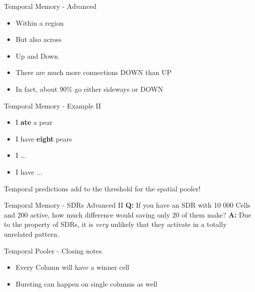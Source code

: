 \begin{frame}[c]{Temporal Memory - Advanced}
    \Large
    \begin{itemize}[<+(1)->]
        \item Within a region
        \item But also across
        \item Up and Down
        \item There are much more connections DOWN than UP
        \item In fact, about 90\% go either sideways or DOWN
    \end{itemize}
\end{frame}


\begin{frame}[c]{Temporal Memory - Example II}
    \Large
    \begin{itemize}[<+(1)->]
        \item I \textbf{ate} a pear
        \item I have \textbf{eight} pears
    \end{itemize}
    \vfill
    \begin{itemize}[<+(1)->]
        \item I ...
        \item I have ...
    \end{itemize}
    \pause
    Temporal predictions add to the threshold for the spatial pooler!
\end{frame}


\begin{frame}[c]{Temporal Memory - SDRs Advanced II}
    \Large
    \textbf{Q:} If you have an SDR with 10 000 Cells and 200 active, how much difference would saving only 20 of them make?
    \newline
    \pause
    \newline
    \textbf{A:} Due to the property of SDRs, it is {\em very} unlikely that they activate in a totally unrelated pattern.
\end{frame}














\begin{frame}[c]{Temporal Pooler - Closing notes}
    \begin{itemize}[<+(1)->]
        \item Every Column will have a winner cell
        \item Bursting can happen on single columns as well
    \end{itemize}
\end{frame}


